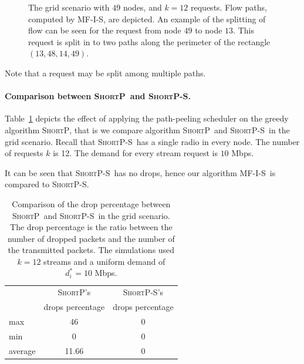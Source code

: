 \documentclass[12pt,oneside,english,a4paper]{book}
\theoremstyle{plain}
\theoremstyle{definition}
\theoremstyle{Theorem}
\theoremstyle{plain}
\newenvironment{proof sketch}[1]{\noindent {\emph{Proof sketch of #1:}}}{\hfill \qed}
\newcommand{\algA}{\textsc{MF-I-S}}
\newcommand{\algB}{\textsc{ShortP}}
\newcommand{\algBS}{\textsc{ShortP-S}}
\begin{document}
\begin{figure}[H]
      \centering
        \caption{The grid scenario with $49$ nodes, and $k=12$
          requests.  Flow paths, computed by \algA, are depicted.  An
          example of the splitting of flow can be seen for the request
          from node $49$ to node $13$. This request is split in to
          two paths along the perimeter of the rectangle
          $(13,48,14,49)$.}
      \label{fig:big6}\label{fig:scenario grid}
     \end{figure}

Note that a request may be split among multiple paths.

\paragraph{Comparison between \algB\ and \algBS.}
Table~\ref{tab:dropsBS} depicts the effect of applying the path-peeling scheduler on the greedy algorithm \algB, that is we compare algorithm \algB\ and \algBS\ in the grid scenario.
Recall that \algBS\ has a single radio in every node.
The number of requests $k$ is 12. The demand for every stream request is $10$ Mbps.

It can be seen that \algBS\ has no drops, hence our algorithm \algA\ is compared to \algBS.
\begin{table}
\centering\small
\begin{tabular}{|| l || c | c ||}

\hline
 & \algB 's            & \algBS 's \\
    &  drops percentage   & drops percentage \\
\hline\hline
max     & 46 & 0  \\
min     & 0 & 0 \\
average & 11.66  & 0 \\
\hline
\end{tabular}
\caption{
  Comparison of the drop percentage between \algB\ and \algBS\ in the grid scenario. The drop percentage is
  the ratio between the number of
  dropped packets and the number of the transmitted packets. The simulations used $k=12$ streams and a uniform demand of $d_i^*=10$ Mbps.}
\label{tab:dropsBS}
\end{table}
\end{document}
